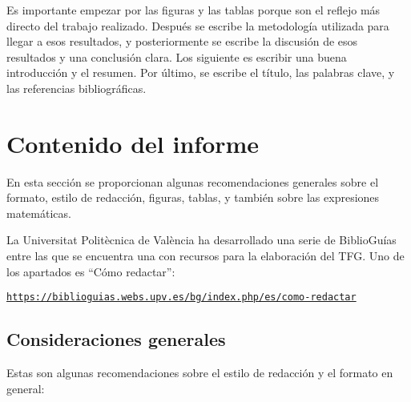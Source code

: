 \documentclass[11pt]{article}
\begin{document}
Es importante empezar por las figuras y las tablas porque son el reflejo más directo del trabajo realizado. Después se escribe la metodología utilizada para llegar a esos resultados, y posteriormente se escribe la discusión de esos resultados y una conclusión clara. Los siguiente es escribir una buena introducción y el resumen. Por último, se escribe el título, las palabras clave, y las referencias bibliográficas.


\section{Contenido del informe}
\label{sec:contenido}

En esta sección se proporcionan algunas recomendaciones generales sobre el formato, estilo de redacción, figuras, tablas, y también sobre las expresiones matemáticas.

La Universitat Politècnica de València ha desarrollado una serie de BiblioGuías entre las que se encuentra una con recursos para la elaboración del TFG. Uno de los apartados es “Cómo redactar”:

\texttt{\url{https://biblioguias.webs.upv.es/bg/index.php/es/como-redactar}}


\subsection{Consideraciones generales}

Estas son algunas recomendaciones sobre el estilo de redacción y el formato en general:
\end{document}
